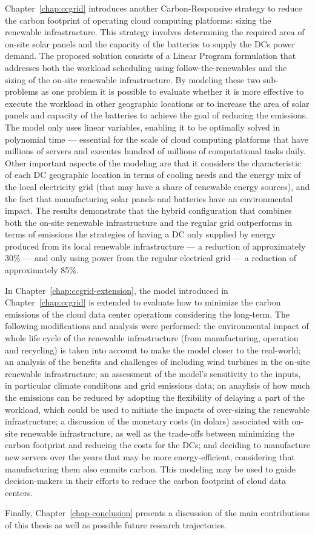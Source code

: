 Chapter~\ref{chap:ccgrid} introduces another Carbon-Responsive strategy to reduce the carbon footprint of operating cloud computing platforms: sizing the renewable infrastructure. This strategy involves determining the required area of on-site solar panels and the capacity of the batteries to supply the DCs power demand. The proposed solution consists of a Linear Program formulation that addresses both the workload scheduling using follow-the-renewables and the sizing of the on-site renewable infrastructure. By modeling these two sub-problems as one problem it is possible to evaluate whether it is more effective to execute the workload in other geographic locations or to increase the area of solar panels and capacity of the batteries to achieve the goal of reducing the  emissions. The model only uses linear variables, enabling it to be optimally solved in polynomial time --- essential for the scale of cloud computing platforms that have millions of servers and executes hundred of millions of computational tasks daily. Other important aspects of the modeling are that it considers the characteristic of each DC geographic location in terms of cooling needs and the energy mix of the local electricity grid (that may have a share of renewable energy sources), and the fact that manufacturing solar panels and batteries have an environmental impact. The results demonstrate that the hybrid configuration that combines both the on-site renewable infrastructure and the regular grid outperforms in terms of  emissions the strategies of having a DC only supplied by energy produced from its local renewable infrastructure --- a reduction of approximately 30\% --- and only using power from the regular electrical grid --- a reduction of approximately 85\%.

In Chapter~\ref{chap:ccgrid-extension}, the model introduced in Chapter~\ref{chap:ccgrid} is extended to evaluate how to minimize the carbon emissions of the cloud data center operations considering the long-term. The following modifications and analysis were performed: the environmental impact of whole life cycle of the renewable infrastructure (from manufacturing, operation and recycling) is taken into account to make the model closer to the real-world; an analysis of the benefits and challenges of including wind turbines in the on-site renewable infrastructure; an assessment of the model's sensitivity to the inputs, in particular climate condiitons and grid emissions data; an anaylisis of how much the  emissions can be reduced by adopting the flexibility of delaying a part of the workload, which could be used to mitiate the impacts of over-sizing the renewable infrastructure; a discussion of the monetary costs (in dolars) associated with on-site renewable infrastructure, as well as the trade-offs between minimizing the carbon footprint and reducing the costs for the DCs; and deciding to manufacture new servers over the years that may be more energy-efficient, considering that manufacturing them also emmits carbon. This modeling may be used to guide decision-makers in their efforts to reduce the carbon footprint of cloud data centers.

Finally, Chapter~\ref{chap-conclusion} presents a discussion of the main contributions of this thesis as well as possible future research trajectories.